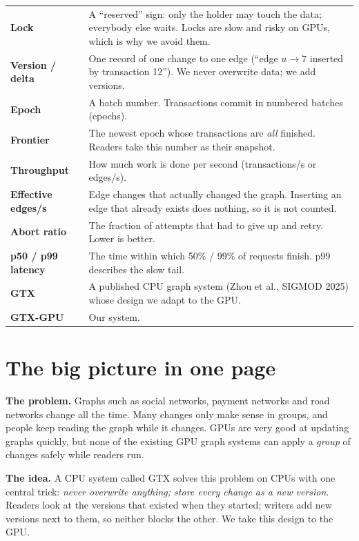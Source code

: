 \documentclass[11pt,a4paper]{article}
\begin{document}
\begin{center}
\begin{tabular}{@{}>{\raggedright\arraybackslash\bfseries}p{3.1cm}>{\raggedright\arraybackslash}p{12.2cm}@{}}
Lock & A ``reserved'' sign: only the holder may touch the data; everybody else waits. Locks are slow and risky on
  GPUs, which is why we avoid them. \\
Version / delta & One record of one change to one edge (``edge $u\to7$ inserted by transaction 12''). We never overwrite
  data; we add versions. \\
Epoch & A batch number. Transactions commit in numbered batches (epochs). \\
Frontier & The newest epoch whose transactions are \emph{all} finished. Readers take this number as their snapshot. \\
Throughput & How much work is done per second (transactions/s or edges/s). \\
Effective edges/s & Edge changes that actually changed the graph. Inserting an edge that already exists does nothing,
  so it is not counted. \\
Abort ratio & The fraction of attempts that had to give up and retry. Lower is better. \\
p50 / p99 latency & The time within which 50\% / 99\% of requests finish. p99 describes the slow tail. \\
GTX & A published CPU graph system (Zhou et al., SIGMOD 2025) whose design we adapt to the GPU. \\
GTX-GPU & Our system. \\
\bottomrule
\end{tabular}
\end{center}

\section{The big picture in one page}
\label{sec:big}

\textbf{The problem.} Graphs such as social networks, payment networks and road networks change all the time. Many
changes only make sense in groups, and people keep reading the graph while it changes. GPUs are very good at updating
graphs quickly, but none of the existing GPU graph systems can apply a \emph{group} of changes safely while readers run.

\textbf{The idea.} A CPU system called GTX solves this problem on CPUs with one central trick: \emph{never overwrite
anything; store every change as a new version}. Readers look at the versions that existed when they started; writers
add new versions next to them, so neither blocks the other. We take this design to the GPU.
\end{document}
